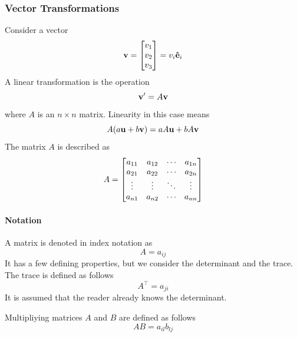 	\subsubsection{Vector Transformations}
			Consider a vector 
			\[
				\vb{v} = \mqty[
					v_1\\
					v_2\\
					v_3
					] = v_i\vu{e}_i
			\]
			A linear transformation is the operation
			\begin{equation}
				\vb{v}' = A\vb{v}
			\end{equation}
			where $A$ is an $n\times n$ matrix. Linearity in this case means
			\begin{equation}
				A(a\vb{u} + b\vb{v}) = aA\vb{u} + bA\vb{v}
			\end{equation}
			The matrix $A$ is described as 
			\begin{equation}
				A = \mqty[
					a_{11} & a_{12} & \cdots & a_{1n} \\
					a_{21} & a_{22} & \cdots & a_{2n} \\
					\vdots & \vdots & \ddots & \vdots \\
					a_{n1} & a_{n2} & \cdots & a_{nn}
				]
			\end{equation}
			\paragraph{Notation} A matrix is denoted in index notation as 
			\[
				A = a_{ij}
			\]
			It has a few defining properties, but we consider the determinant and the trace.
			The trace is defined as follows
			\[
				A^\top = a_{ji}
			\]
			It is assumed that the reader already knows the determinant.

			Multipliying matrices $A$ and $B$ are defined as follows
			\[
				AB = a_{il}b_{lj}
			\]

